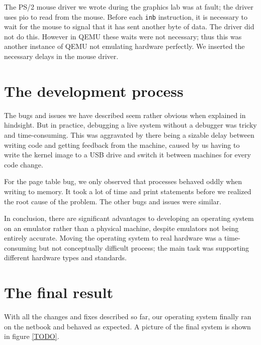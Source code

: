 \documentclass{report}
\begin{document}
The PS/2 mouse driver we wrote during the graphics lab was at fault; the
driver uses \gls{pio} to read from the mouse. Before each \texttt{inb}
instruction, it is necessary to wait for the mouse to signal that it has sent
another byte of data. The driver did not do this. However in QEMU these waits
were not necessary; thus this was another instance of QEMU not emulating
hardware perfectly. We inserted the necessary delays in the mouse driver.


\section{The development process}
The bugs and issues we have described seem rather obvious when explained in
hindsight. But in practice, debugging a live system without a debugger was
tricky and time-consuming. This was aggravated by there being a sizable delay
between writing code and getting feedback from the machine, caused by us
having to write the kernel image to a USB drive and switch it between
machines for every code change.

For the page table bug, we only observed that processes behaved oddly when
writing to memory. It took a lot of time and print statements before we
realized the root cause of the problem. The other bugs and issues were
similar.

In conclusion, there are significant advantages to developing an operating
system on an emulator rather than a physical machine, despite emulators not
being entirely accurate. Moving the operating system to real hardware was a
time-consuming but not conceptually difficult process; the main task was
supporting different hardware types and standards.


\section{The final result}
With all the changes and fixes described so far, our operating system finally
ran on the netbook and behaved as expected. A picture of the final system is
shown in figure \ref{TODO}.




\end{document}
